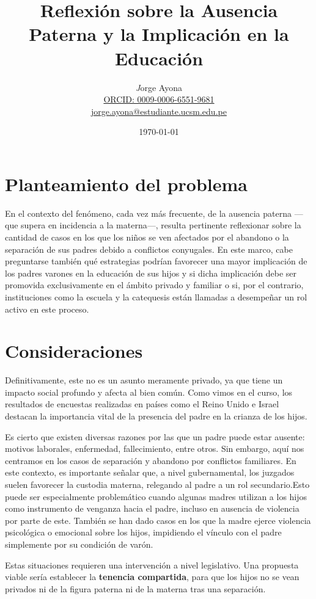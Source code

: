 \documentclass[a4paper,12pt]{article}
\title{Reflexión sobre la Ausencia Paterna y la Implicación en la Educación}
\author{\textit Jorge Ayona \\ \href{https://orcid.org/0009-0006-6551-9681}{ORCID: 0009-0006-6551-9681}\\
\href{mailto:jorge.ayona@estudiante.ucsm.edu.pe}{jorge.ayona@estudiante.ucsm.edu.pe}}
\date{\today}
\begin{document}
\maketitle

\section*{Planteamiento del problema}

En el contexto del fenómeno, cada vez más frecuente, de la ausencia paterna —que supera en incidencia a la materna—, resulta pertinente reflexionar sobre la cantidad de casos en los que los niños se ven afectados por el abandono o la separación de sus padres debido a conflictos conyugales. En este marco, cabe preguntarse también qué estrategias podrían favorecer una mayor implicación de los padres varones en la educación de sus hijos y si dicha implicación debe ser promovida exclusivamente en el ámbito privado y familiar o si, por el contrario, instituciones como la escuela y la catequesis están llamadas a desempeñar un rol activo en este proceso.



\section*{Consideraciones}

Definitivamente, este no es un asunto meramente privado, ya que tiene un impacto social profundo y afecta al bien común. Como vimos en el curso, los resultados de encuestas realizadas en países como el Reino Unido e Israel destacan la importancia vital de la presencia del padre en la crianza de los hijos.

Es cierto que existen diversas razones por las que un padre puede estar ausente: motivos laborales, enfermedad, fallecimiento, entre otros. Sin embargo, aquí nos centramos en los casos de separación y abandono por conflictos familiares. En este contexto, es importante señalar que, a nivel gubernamental, los juzgados suelen favorecer la custodia materna, relegando al padre a un rol secundario.Esto puede ser especialmente problemático cuando algunas madres utilizan a los hijos como instrumento de venganza hacia el padre, incluso en ausencia de violencia por parte de este. También se han dado casos en los que la madre ejerce violencia psicológica o emocional sobre los hijos, impidiendo el vínculo con el padre simplemente por su condición de varón.

Estas situaciones requieren una intervención a nivel legislativo. Una propuesta viable sería establecer la \textbf{tenencia compartida}, para que los hijos no se vean privados ni de la figura paterna ni de la materna tras una separación.
\end{document}
